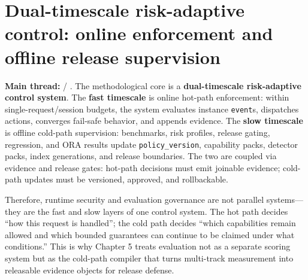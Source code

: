\documentclass[11pt,a4paper]{report}
\begin{document}
\section{Dual-timescale risk-adaptive control: online enforcement and offline release supervision}
\textbf{Main thread:} \ControlPlane{} / \EvalFramework{}. The methodological core is a \textbf{dual-timescale risk-adaptive control system}. The \textbf{fast timescale} is online hot-path enforcement: within single-request/session budgets, the system evaluates instance \texttt{event}s, dispatches actions, converges fail-safe behavior, and appends evidence. The \textbf{slow timescale} is offline cold-path supervision: benchmarks, risk profiles, release gating, regression, and ORA results update \texttt{policy\_version}, capability packs, detector packs, index generations, and release boundaries. The two are coupled via evidence and release gates: hot-path decisions must emit joinable evidence; cold-path updates must be versioned, approved, and rollbackable.

Therefore, runtime security and evaluation governance are not parallel systems—they are the fast and slow layers of one control system. The hot path decides “how this request is handled”; the cold path decides “which capabilities remain allowed and which bounded guarantees can continue to be claimed under what conditions.” This is why Chapter 5 treats evaluation not as a separate scoring system but as the cold-path compiler that turns multi-track measurement into releasable evidence objects for release defense.

\end{document}
